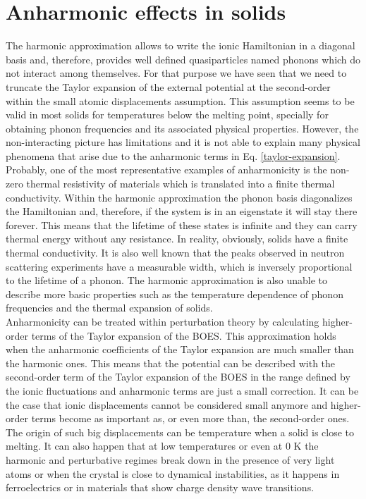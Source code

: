 \section{Anharmonic effects in solids}
The harmonic approximation allows to write the ionic Hamiltonian in a diagonal basis and, therefore, provides well defined quasiparticles named phonons which do not interact among themselves. For that purpose 
we have seen that we need to truncate the Taylor expansion of the external potential at the second-order within the small atomic displacements assumption. This assumption seems to be valid in most solids 
for temperatures below the melting point, specially for obtaining phonon frequencies and its associated physical properties\cite{born1954dynamical}. However, the non-interacting picture has limitations and it 
is not able to explain many physical phenomena that arise due to the anharmonic terms in Eq. \ref{taylor-expansion}. Probably, one of the most representative examples of anharmonicity is the non-zero thermal 
resistivity of materials which is translated into a finite thermal conductivity. Within the harmonic approximation the phonon basis diagonalizes the Hamiltonian and, therefore, if the system is in an eigenstate 
it will stay there forever. This means that the lifetime of these states is infinite and they can carry thermal energy without any resistance. In reality, obviously, solids have a finite thermal conductivity. 
It is also well known that the peaks observed in neutron scattering experiments have a measurable width, which is inversely proportional to the lifetime of a phonon. The harmonic approximation is also unable 
to describe more basic properties such as the temperature dependence of phonon frequencies and the thermal expansion of solids. \\ 

Anharmonicity can be treated within perturbation theory by calculating higher-order terms of the Taylor expansion of the BOES. This approximation holds when the anharmonic coefficients of the Taylor expansion 
are much smaller than the harmonic ones. This means that the potential can be described with the second-order term of the Taylor expansion of the BOES in the range defined by the ionic fluctuations and anharmonic 
terms are just a small correction. It can be the case that ionic displacements cannot be considered small anymore and higher-order terms become as important as, or even more than, the second-order 
ones. The origin of such big displacements can be temperature when a solid is close to melting. It can also happen that at low temperatures or even at $0$ K the harmonic and perturbative regimes break down in the 
presence of very light atoms\cite{borinaga2017anharmonicity} or when the crystal is close to dynamical instabilities, as it happens in 
ferroelectrics\cite{ribeiro2018strong,zhang2011anomalous} or in materials that show charge density wave transitions\cite{kidd2002electron,leroux2015strong}. \\

